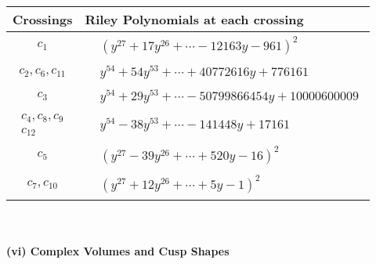\documentclass[1p]{elsarticle_modified}
\theoremstyle{definition}
\begin{document}
\begin{tabular}{m{50pt}|m{274pt}}
Crossings & \hspace{64pt}Riley Polynomials at each crossing \\
\hline $$\begin{aligned}c_{1}\end{aligned}$$&$\begin{aligned}
&(y^{27}+17 y^{26}+\cdots-12163 y-961)^{2}
\end{aligned}$\\
\hline $$\begin{aligned}c_{2},c_{6},c_{11}\end{aligned}$$&$\begin{aligned}
&y^{54}+54 y^{53}+\cdots+40772616 y+776161
\end{aligned}$\\
\hline $$\begin{aligned}c_{3}\end{aligned}$$&$\begin{aligned}
&y^{54}+29 y^{53}+\cdots-50799866454 y+10000600009
\end{aligned}$\\
\hline $$\begin{aligned}c_{4},c_{8},c_{9}\\c_{12}\end{aligned}$$&$\begin{aligned}
&y^{54}-38 y^{53}+\cdots-141448 y+17161
\end{aligned}$\\
\hline $$\begin{aligned}c_{5}\end{aligned}$$&$\begin{aligned}
&(y^{27}-39 y^{26}+\cdots+520 y-16)^{2}
\end{aligned}$\\
\hline $$\begin{aligned}c_{7},c_{10}\end{aligned}$$&$\begin{aligned}
&(y^{27}+12 y^{26}+\cdots+5 y-1)^{2}
\end{aligned}$\\
\hline
\end{tabular}\\~\\
\newpage\flushleft \textbf{(vi) Complex Volumes and Cusp Shapes}
\end{document}
